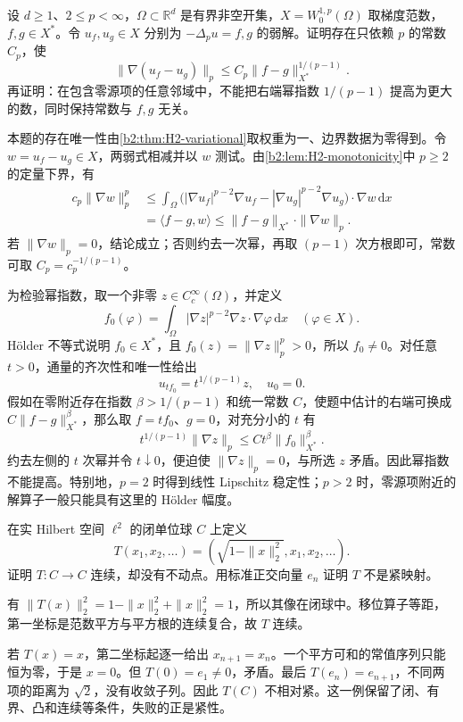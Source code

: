 \begin{exercise}\label{b2:ex:H2-stability}
设 \(d\ge1\)、\(2\le p<\infty\)，\(\Omega\subset\mathbb R^d\) 是有界非空开集，\(X=W_0^{1,p}(\Omega)\) 取梯度范数，\(f,g\in X^*\)。令 \(u_f,u_g\in X\) 分别为 \(-\Delta_pu=f,g\) 的弱解。证明存在只依赖 \(p\) 的常数 \(C_p\)，使
\[
 \|\nabla(u_f-u_g)\|_p
 \le C_p\|f-g\|_{X^*}^{1/(p-1)}.
\]
再证明：在包含零源项的任意邻域中，不能把右端幂指数 \(1/(p-1)\) 提高为更大的数，同时保持常数与 \(f,g\) 无关。
\end{exercise}
\begin{solution}
本题的存在唯一性由\cref{b2:thm:H2-variational}取权重为一、边界数据为零得到。令 \(w=u_f-u_g\in X\)，两弱式相减并以 \(w\) 测试。由\cref{b2:lem:H2-monotonicity}中 \(p\ge2\) 的定量下界，有
\begin{align*}
 c_p\|\nabla w\|_p^p
 &\le\int_\Omega
   \bigl(|\nabla u_f|^{p-2}\nabla u_f
          -|\nabla u_g|^{p-2}\nabla u_g\bigr)
       \cdot\nabla w\,\mathrm dx\\
 &=\langle f-g,w\rangle
 \le\|f-g\|_{X^*}\cdot\|\nabla w\|_p.
\end{align*}
若 \(\|\nabla w\|_p=0\)，结论成立；否则约去一次幂，再取 \((p-1)\) 次方根即可，常数可取 \(C_p=c_p^{-1/(p-1)}\)。

为检验幂指数，取一个非零 \(z\in C_c^\infty(\Omega)\)，并定义
\[
 f_0(\varphi)=\int_\Omega|\nabla z|^{p-2}\nabla z\cdot\nabla\varphi\,\mathrm dx
 \quad(\varphi\in X).
\]
Hölder 不等式说明 \(f_0\in X^*\)，且
\(f_0(z)=\|\nabla z\|_p^p>0\)，所以 \(f_0\ne0\)。对任意 \(t>0\)，通量的齐次性和唯一性给出
\[
 u_{tf_0}=t^{1/(p-1)}z,\quad u_0=0.
\]
假如在零附近存在指数 \(\beta>1/(p-1)\) 和统一常数 \(C\)，使题中估计的右端可换成 \(C\|f-g\|_{X^*}^\beta\)，那么取 \(f=tf_0\)、\(g=0\)，对充分小的 \(t\) 有
\[
 t^{1/(p-1)}\|\nabla z\|_p
 \le C t^\beta\|f_0\|_{X^*}^\beta.
\]
约去左侧的 \(t\) 次幂并令 \(t\downarrow0\)，便迫使 \(\|\nabla z\|_p=0\)，与所选 \(z\) 矛盾。因此幂指数不能提高。特别地，\(p=2\) 时得到线性 Lipschitz 稳定性；\(p>2\) 时，零源项附近的解算子一般只能具有这里的 Hölder 幅度。
\end{solution}

\begin{exercise}[紧性条件的作用]
\label{b2:ex:H3-noncompact-shift}
在实 Hilbert 空间 \(\ell^2\) 的闭单位球 \(C\) 上定义
\[
 T(x_1,x_2,\ldots)=\left(\sqrt{1-\|x\|_2^2},x_1,x_2,\ldots\right).
\]
证明 \(T:C\to C\) 连续，却没有不动点。用标准正交向量 \(e_n\) 证明 \(T\) 不是紧映射。
\end{exercise}
\begin{solution}
有 \(\|T(x)\|_2^2=1-\|x\|_2^2+\|x\|_2^2=1\)，所以其像在闭球中。移位算子等距，第一坐标是范数平方与平方根的连续复合，故 \(T\) 连续。

若 \(T(x)=x\)，第二坐标起逐一给出 \(x_{n+1}=x_n\)。一个平方可和的常值序列只能恒为零，于是 \(x=0\)。但 \(T(0)=e_1\ne0\)，矛盾。最后 \(T(e_n)=e_{n+1}\)，不同两项的距离为 \(\sqrt2\)，没有收敛子列。因此 \(T(C)\) 不相对紧。这一例保留了闭、有界、凸和连续等条件，失败的正是紧性。
\end{solution}

